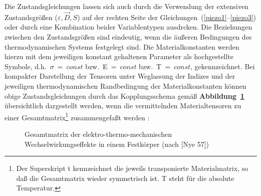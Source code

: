 Die Zustandsgleichungen lassen sich auch durch die Verwendung der
extensiven Zustandsgrößen ($\varepsilon, \vec{D}, S$) auf der
rechten Seite der Gleichungen~(\ref{piezo1}--\ref{piezo3}) oder
durch eine Kombination beider Variablentypen ausdrcken.
Die Beziehungen zwischen den Zustandsgrößen sind eindeutig,
wenn die äußeren Bedingungen des thermodynamischen Systems festgelegt
sind. Die Materialkonstanten werden hierzu mit dem jeweiligen konstant
gehaltenen Parameter als hochgestellte Symbole, d.h.\ $\sigma$~=~$const$
bzw.\ E~=~$const$ bzw.\ T~=~$const$, gekennzeichnet. Bei kompakter
Darstellung der Tensoren unter Weglassung der Indizes und der jeweiligen
thermodynamischen Randbedingung der Materialkonstanten können obige
Zustandsgleichungen durch das Kopplungsschema gemäß
{\bf Abbildung~\ref{abbkopplungsschema}}
übersichtlich dargestellt werden, wenn die vermittelnden
Materialtensoren zu einer Gesamtmatrix\footnote{Der Superskript t
kennzeichnet die jeweils transponierte Materialmatrix, so daß die
Gesamtmatrix wieder symmetrisch ist. T steht für die absolute
Temperatur.} zusammengefaßt werden \cite{Nye57}:
\begin{figure}[htb]
\begin{center}

\setabbzd
\end{center}
\caption{\label{abbkopplungsschema}
 Gesamtmatrix der elektro-thermo-mechanischen
 Wechselwirkungseffekte in einem Festkörper (nach [Nye 57])}
\end{figure}

